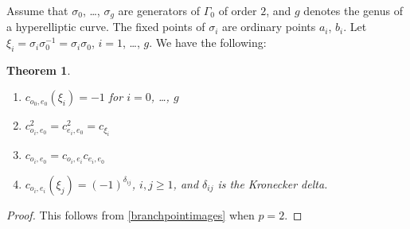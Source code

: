 \documentclass[]{amsart}
\numberwithin{equation}{section}
\newtheorem{theorem}{Theorem}[section]
\begin{document}
Assume that  $\sigma_0$, \ldots, $\sigma_g$ are generators of $\Gamma_0$ of order $2$,
and $g$ denotes the genus of a hyperelliptic curve. 
The fixed points of $\sigma_i$ are ordinary points $a_i$, $b_i$. Let $\xi_i = \sigma_i \sigma_0^{-1}=\sigma_i\sigma_0$, 
$i=1$, \ldots, $g$. We have the following: 
\begin{theorem}\
\begin{enumerate} 
\item $c_{o_0,e_0}(\xi_i)=-1$ for $i=0$, \ldots, $g$ \label{first}
\item $c_{o_i, e_0}^2=c_{e_i, e_0}^2=c_{\xi_i}$\label{second}
\item $c_{o_i, e_0}=c_{o_i, e_i}c_{e_i, e_0}$\label{third}
\item $c_{o_i,e_i}(\xi_j)=(-1)^{\delta_{ij}}$, $i,j\geq 1$, and $\delta_{ij}$ is the Kronecker delta. \label{fourth}
\end{enumerate} 
\end{theorem} 
 \begin{proof} 
 This follows from \ref{branchpointimages} when $p=2.$
 \end{proof}
%
\end{document}
